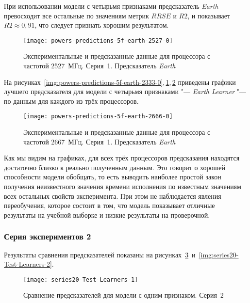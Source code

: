 При использовании модели с четырьмя признаками предсказатель \textit{Earth} превосходит все остальные по значениям метрик $RRSE$ и $R2$, и показывает $R2 \approx 0,91$, что следует признать хорошим результатом.

\begin{figure}[tbp]
    \begin{center}
        \texttt{[image: powers-predictions-5f-earth-2527-0]}
        \caption{Экспериментальные и предсказанные данные для процессора с частотой 2527~МГц. Серия~1. Предсказатель \textit{Earth}}
        \label{img:powers-predictions-5f-earth-2527-0}
    \end{center}
\end{figure}

На рисунках~\ref{img:powers-predictions-5f-earth-2333-0},\,\ref{img:powers-predictions-5f-earth-2527-0},\,\ref{img:powers-predictions-5f-earth-2666-0} приведены графики лучшего предсказателя для модели с четырьмя признаками "--- \textit{Earth Learner} "--- по данным для каждого из трёх процессоров.

\begin{figure}[tbp]
    \begin{center}
        \texttt{[image: powers-predictions-5f-earth-2666-0]}
        \caption{Экспериментальные и предсказанные данные для процессора с частотой 2667~МГц. Серия~1. Предсказатель \textit{Earth}}
        \label{img:powers-predictions-5f-earth-2666-0}
    \end{center}
\end{figure}

Как мы видим на графиках, для всех трёх процессоров предсказания находятся достаточно близко к реально полученным данным. Это говорит о хорошей способности модели обобщать, то есть выводить наиболее простой закон получения неизвестного значения времени исполнения по известным значениям всех остальных свойств эксперимента. При этом не наблюдается явления переобучения, которое состоит в том, что модель показывает отличные результаты на учебной выборке и низкие результаты на проверочной.


\subsubsection{Серия экспериментов 2}

Результаты сравнения предсказателей показаны на рисунках~\ref{img:series20-Test-Learners-1}~и~\ref{img:series20-Test-Learners-2}.

\begin{figure}[H]
    \begin{center}
            \texttt{[image: series20-Test-Learners-1]}
            \caption{Сравнение предсказателей для модели с одним признаком. Серия~2} %
            \label{img:series20-Test-Learners-1} %
    \end{center}
\end{figure}


